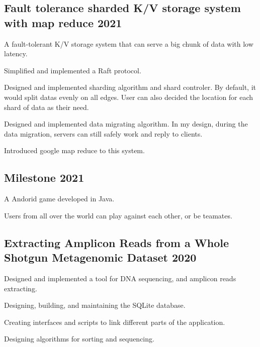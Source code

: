 \documentclass[letter,10pt]{article}
\begin{document}
\subsection{{Fault tolerance sharded K/V storage system with map reduce  \hfill 2021}}
\begin{zitemize}
    \item A fault-tolerant K/V storage system that can serve a big chunk of data with low latency.
    \item Simplified and implemented a Raft protocol.
    \item Designed and implemented sharding algorithm and shard controler. By default, it would split datas evenly on all edges. User can also decided the location for each shard of data as their need.
    \item Designed and implemented data migrating algorithm. In my design, during the data migration, servers can still safely work and reply to clients.
    \item Introduced google map reduce to this system.
\end{zitemize}



\subsection{{Milestone  \hfill 2021}}
\begin{zitemize}
    \item A Andorid game developed in Java.
    \item Users from all over the world can play against each other, or be teamates.
\end{zitemize}


\subsection{{Extracting Amplicon Reads from a Whole Shotgun Metagenomic Dataset  \hfill 2020}}
\begin{zitemize}
    \item Designed and implemented a tool for DNA sequencing, and amplicon reads extracting.
    \item Designing, building, and maintaining the SQLite database.
    \item Creating interfaces and scripts to link different parts of the application.
    \item Designing algorithms for sorting and sequencing.
\end{zitemize}
\end{document}
